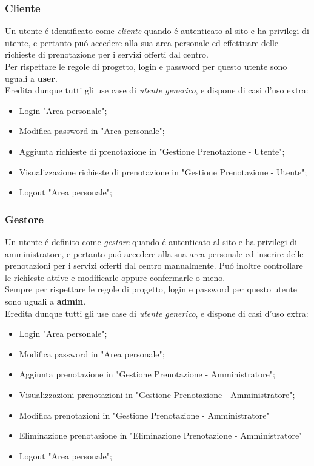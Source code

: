 \documentclass[]{article}
\begin{document}
\subsubsection{Cliente}
Un utente é identificato come \textit{cliente} quando é autenticato al sito e ha privilegi di utente, e pertanto puó accedere alla sua area personale ed effettuare delle richieste di prenotazione per i servizi offerti dal centro.\\
Per rispettare le regole di progetto, login e password per questo utente sono uguali a \textbf{user}.\\
Eredita dunque tutti gli use case di \textit{utente generico}, e dispone di casi d'uso extra:
\begin{itemize}
	\item Login "Area personale";
	\item Modifica password in "Area personale";
	\item Aggiunta richieste di prenotazione in "Gestione Prenotazione - Utente";
	\item Visualizzazione richieste di prenotazione in "Gestione Prenotazione - Utente";
	\item Logout "Area personale";
\end{itemize}
\subsubsection{Gestore}
Un utente é definito come \textit{gestore} quando é autenticato al sito e ha privilegi di amministratore, e pertanto puó accedere alla sua area personale ed inserire delle prenotazioni per i servizi offerti dal centro manualmente. Puó inoltre controllare le richieste attive e modificarle oppure confermarle o meno.\\
Sempre per rispettare le regole di progetto, login e password per questo utente sono uguali a \textbf{admin}.\\
Eredita dunque tutti gli use case di \textit{utente generico}, e dispone di casi d'uso extra:
\begin{itemize}
	\item Login "Area personale";
	\item Modifica password in "Area personale";
	\item Aggiunta prenotazione in "Gestione Prenotazione - Amministratore";
	\item Visualizzazioni prenotazioni in "Gestione Prenotazione - Amministratore";
	\item Modifica prenotazioni in "Gestione Prenotazione - Amministratore"
 	\item Eliminazione prenotazione in "Eliminazione Prenotazione - Amministratore"
	\item Logout "Area personale";
\end{itemize}
\end{document}
